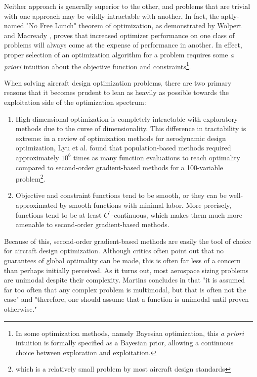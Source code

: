 Neither approach is generally superior to the other, and problems that are trivial with one approach may be wildly intractable with another. In fact, the aptly-named "No Free Lunch" theorem of optimization, as demonstrated by Wolpert and Macready \cite{Wolpert1997}, proves that increased optimizer performance on one class of problems will always come at the expense of performance in another. In effect, proper selection of an optimization algorithm for a problem requires some \textit{a priori} intuition about the objective function and constraints\footnote{In some optimization methods, namely Bayesian optimization, this \textit{a priori} intuition is formally specified as a Bayesian prior, allowing a continuous choice between exploration and exploitation.}.

When solving aircraft design optimization problems, there are two primary reasons that it becomes prudent to lean as heavily as possible towards the exploitation side of the optimization spectrum:

\begin{enumerate}
    \item High-dimensional optimization is completely intractable with exploratory methods due to the curse of dimensionality. This difference in tractability is extreme: in a review of optimization methods for aerodynamic design optimization, Lyu et al. found that population-based methods required approximately $10^6$ times as many function evaluations to reach optimality compared to second-order gradient-based methods \cite{lyu2014} for a 100-variable problem\footnote{which is a relatively small problem by most aircraft design standards}.

    \item Objective and constraint functions tend to be smooth, or they can be well-approximated by smooth functions with minimal labor. More precisely, functions tend to be at least $C^1$-continuous, which makes them much more amenable to second-order gradient-based methods.
\end{enumerate}

Because of this, second-order gradient-based methods are easily the tool of choice for aircraft design optimization. Although critics often point out that no guarantees of global optimality can be made, this is often far less of a concern than perhaps initially perceived. As it turns out, most aerospace sizing problems are unimodal despite their complexity. Martins concludes in \cite{mdobook} that "it is assumed far too often that any complex problem is multimodal, but that is often not the case" and "therefore, one should assume that a function is unimodal until proven otherwise."


